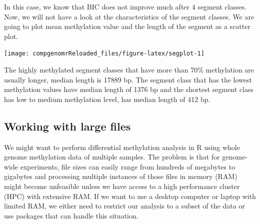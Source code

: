\documentclass[12pt,]{krantz}
\newenvironment{Shaded}{\begin{snugshade}}{\end{snugshade}}
\newcommand{\CommentTok}[1]{\textcolor[rgb]{0.56,0.35,0.01}{\textit{#1}}}
\newcommand{\DataTypeTok}[1]{\textcolor[rgb]{0.13,0.29,0.53}{#1}}
\newcommand{\DecValTok}[1]{\textcolor[rgb]{0.00,0.00,0.81}{#1}}
\newcommand{\FloatTok}[1]{\textcolor[rgb]{0.00,0.00,0.81}{#1}}
\newcommand{\KeywordTok}[1]{\textcolor[rgb]{0.13,0.29,0.53}{\textbf{#1}}}
\newcommand{\NormalTok}[1]{#1}
\newcommand{\OperatorTok}[1]{\textcolor[rgb]{0.81,0.36,0.00}{\textbf{#1}}}
\newcommand{\StringTok}[1]{\textcolor[rgb]{0.31,0.60,0.02}{#1}}
\begin{document}
In this case, we know that BIC does not improve much after 4 segment classes. Now, we will not have a look at the characteristics of the segment classes. We are going to plot mean methylation value and the length of the segment as a scatter plot.

\begin{Shaded}
\end{Shaded}

\begin{center}\texttt{[image: compgenomrReloaded\_files/figure-latex/segplot-1]} \end{center}

The highly methylated segment classes that have more than 70\% methylation are usually longer, median length is 17889 bp. The segment class that has the lowest methylation values have median length of 1376 bp and the shortest segment class has low to medium methylation level, has median length of 412 bp.

\hypertarget{working-with-large-files}{%
\subsection{Working with large files}\label{working-with-large-files}}

We might want to perform differential methylation analysis in R using whole genome methylation data of multiple samples. The problem is that for genome-wide experiments, file sizes can easily range from hundreds of megabytes to gigabytes and processing multiple instances of those files in memory (RAM) might become unfeasible unless we have access to a high performance cluster (HPC) with extensive RAM. If we want to use a desktop computer or laptop with limited RAM, we either need to restrict our analysis to a subset of the data or use packages that can handle this situation.
\end{document}
